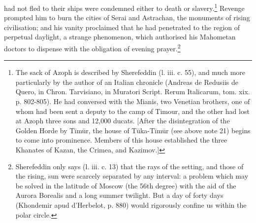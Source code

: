 had not fled to their ships were condemned either to death or slavery.\footnote{The sack of Azoph is described by Sherefeddin (l. iii. c. 55), and much more particularly by the author of an Italian chronicle (Andreas de Redusiis de Quero, in Chron. Tarvisiano, in Muratori Script. Rerum Italicarum, tom. xix. p. 802-805). He had conversed with the Mianis, two Venetian brothers, one of whom had been sent a deputy to the camp of Timour, and the other had lost at Azoph three sons and 12,000 ducats. [After the disintegration of the Golden Horde by Tīmūr, the house of Tūka-Tīmūr (see above note 21) begins to come into prominence. Members of this house established the three Khanates of Kazan, the Crimea, and Kazimov.]} Revenge prompted him to burn the cities of Serai and Astrachan, the monuments of rising civilisation; and his vanity proclaimed that he had penetrated to the region of perpetual daylight, a strange phenomenon, which authorised his Mahometan doctors to dispense with the obligation of evening prayer.\footnote{Sherefeddin only says (l. iii. c. 13) that the rays of the setting, and those of the rising, sun were scarcely separated by any interval: a problem which may be solved in the latitude of Moscow (the 56th degree) with the aid of the Aurora Borealis and a long summer twilight. But a day of forty days (Khondemir apud d\texthebrew{}’Herbelot, p. 880) would rigorously confine us within the polar circle.}

